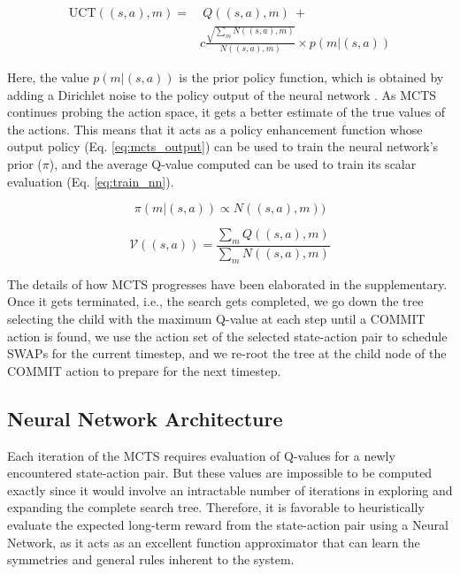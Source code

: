 \begin{equation}\label{eq:uct}
\begin{split}
    \textrm{UCT}((s,a), m) =&\ Q((s,a), m)\ + \\ & c \frac{\sqrt{\sum_m N((s,a), m)}}{N((s,a), m)} \times p(m \vert (s,a))
\end{split}
\end{equation}

Here, the value $p(m | (s,a))$ is the prior policy function, which is obtained by adding a Dirichlet noise to the policy output of the neural network \cite{mcts_alphazero}. As MCTS continues probing the action space, it gets a better estimate of the true values of the actions. This means that it acts as a policy enhancement function whose output policy (Eq. \ref{eq:mcts_output}) can be used to train the neural network's prior ($\pi$), and the average Q-value computed can be used to train its scalar evaluation (Eq. \ref{eq:train_nn}).

\begin{equation}\label{eq:mcts_output}
    \pi(m | (s,a)) \propto N((s, a), m))
\end{equation}

\begin{equation}\label{eq:train_nn}
    \mathcal{V}((s,a)) = \frac{\sum_{m} Q((s,a), m)}{\sum_{m} N((s,a), m)}
\end{equation}



The details of how MCTS progresses have been elaborated in the supplementary. Once it gets terminated, i.e., the search gets completed, we go down the tree selecting the child with the maximum Q-value at each step until a COMMIT action is found, we use the action set of the selected state-action pair to schedule SWAPs for the current timestep, and we re-root the tree at the child node of the COMMIT action to prepare for the next timestep.

\subsection{\label{sec:method-model}Neural Network Architecture}

Each iteration of the MCTS requires evaluation of Q-values for a newly encountered state-action pair. But these values are impossible to be computed exactly since it would involve an intractable number of iterations in exploring and expanding the complete search tree. Therefore, it is favorable to heuristically evaluate the expected long-term reward from the state-action pair using a Neural Network, as it acts as an excellent function approximator that can learn the symmetries and general rules inherent to the system.

